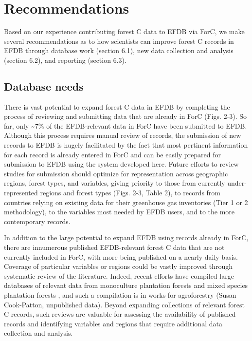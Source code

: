 \documentclass[, manuscript]{copernicus}
\begin{document}
\section{Recommendations}

Based on our experience contributing forest C data to EFDB via ForC, we
make several recommendations as to how scientists can improve forest C
records in EFDB through database work (section 6.1), new data collection
and analysis (section 6.2), and reporting (section 6.3).

\subsection{Database needs}

There is vast potential to expand forest C data in EFDB by completing
the process of reviewing and submitting data that are already in ForC
(Figs. 2-3). So far, only \textasciitilde7\% of the EFDB-relevant data
in ForC have been submitted to EFDB. Although this process requires
manual review of records, the submission of new records to EFDB is
hugely facilitated by the fact that most pertinent information for each
record is already entered in ForC and can be easily prepared for
submission to EFDB using the system developed here. Future efforts to
review studies for submission should optimize for representation across
geographic regions, forest types, and variables, giving priority to
those from currently under-represented regions and forest types (Figs.
2-3, Table 2), to records from countries relying on existing data for
their greenhouse gas inventories (Tier 1 or 2 methodology), to the
variables most needed by EFDB users, and to the more contemporary
records.

In addition to the large potential to expand EFDB using records already
in ForC, there are innumerous published EFDB-relevant forest C data that
are not currently included in ForC, with more being published on a
nearly daily basis. Coverage of particular variables or regions could be
vastly improved through systematic review of the literature. Indeed,
recent efforts have compiled large databases of relevant data from
monoculture plantation forests \citep{bukoski_rates_2022} and mixed
species plantation forests
\citep{feng_multispecies_2022, warner_higher_2022}, and such a
compilation is in works for agroforestry (Susan Cook-Patton, unpublished
data). Beyond expanding collections of relevant forest C records, such
reviews are valuable for assessing the availability of published records
and identifying variables and regions that require additional data
collection and analysis.
\end{document}
